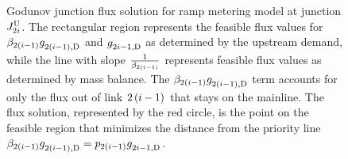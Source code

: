 \begin{figure}
\hfill{}\hfill{}

\caption{Godunov junction flux solution for ramp metering model at junction
$J_{2i}^{\text{U}}$. The rectangular region represents the feasible flux
values for $\beta_{2\left(i-1\right)}g_{2\left(i-1\right),\text{D}}^{}$
and $g_{2i-1,\text{D}}^{}$ as determined by the upstream demand, while
the line with slope\label{fig:Godunov-junction-flux} $\frac{1}{\beta_{2\left(i-1\right)}}$
represents feasible flux values as determined by mass balance. The
$\beta_{2\left(i-1\right)}g_{2\left(i-1\right),\text{D}}^{}$
term accounts for only the flux out of link $2\left(i-1\right)$
that stays on the mainline. The flux solution, represented by the
red circle, is the point on the feasible region that minimizes the
distance from the priority line $\beta_{2\left(i-1\right)}g_{2\left(i-1\right),\text{D}}^{}=p_{2(i-1)}g_{2i-1,\text{D}}^{}$.}
\end{figure}


